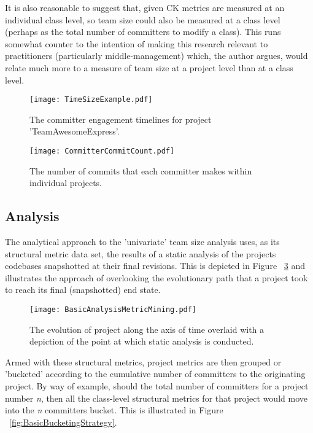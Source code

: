 It is also reasonable to suggest that, given CK metrics are measured at an individual class level, so team size could also be measured at a class level (perhaps as the total number of committers to modify a class). This runs somewhat counter to the intention of making this research relevant to practitioners (particularly middle-management) which, the author argues, would relate much more to a measure of team size at a project level than at a class level.

\begin{figure}[htbp!] 
\centering    
\texttt{[image: TimeSizeExample.pdf]}
\caption{The committer engagement timelines for project 'TeamAwesomeExpress'.}
\label{fig:TeamSizeExample}
\end{figure}

\begin{figure}[htbp!] 
\centering    
\texttt{[image: CommitterCommitCount.pdf]}
\caption{The number of commits that each committer makes within individual projects.}
\label{fig:CommitterCommitCount}
\end{figure}

\subsection{Analysis}
The analytical approach to the 'univariate' team size analysis uses, as its structural metric data set, the results of a static analysis of the projects codebases snapshotted at their final revisions. This is depicted in Figure ~\ref{fig:BasicAnalysisMetricMining} and illustrates the approach of overlooking the evolutionary path that a project took to reach its final (snapshotted) end state.

\begin{figure}[htbp!] 
\centering    
\texttt{[image: BasicAnalysisMetricMining.pdf]}
\caption{The evolution of project along the axis of time overlaid with a depiction of the point at which static analysis is conducted.}
\label{fig:BasicAnalysisMetricMining}
\end{figure}

Armed with these structural metrics, project metrics are then grouped or 'bucketed' according to the cumulative number of committers to the originating project. By way of example, should the total number of committers for a project number \textit{n}, then all the class-level structural metrics for that project would move into the \textit{n} committers bucket. This is illustrated in Figure ~\ref{fig:BasicBucketingStrategy}.
 
